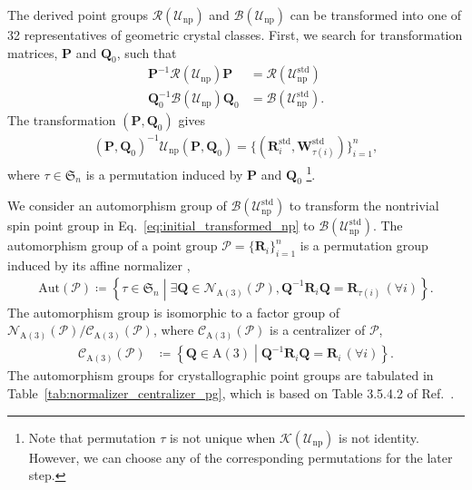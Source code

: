 \documentclass[a4paper, 11pt]{article}
\theoremstyle{definition}
\newcommand{\relmiddle}[1]{\mathrel{}\middle#1\mathrel{}}
\newcommand{\set}[2]{\left\{ #1 \relmiddle| #2 \right\}}
\begin{document}
The derived point groups $\mathcal{R}(\mathcal{U}_{\mathrm{np}})$ and $\mathcal{B}(\mathcal{U}_{\mathrm{np}})$ can be transformed into one of 32 representatives of geometric crystal classes.
First, we search for transformation matrices, $\bm{P}$ and $\bm{Q}_{0}$, such that
\begin{align}
  \bm{P}^{-1} \mathcal{R}(\mathcal{U}_{\mathrm{np}}) \bm{P} &= \mathcal{R}(\mathcal{U}_{\mathrm{np}}^{\mathrm{std}}) \\
  \bm{Q}_{0}^{-1} \mathcal{B}(\mathcal{U}_{\mathrm{np}}) \bm{Q}_{0} &= \mathcal{B}(\mathcal{U}_{\mathrm{np}}^{\mathrm{std}}).
\end{align}
The transformation $(\bm{P}, \bm{Q}_{0})$ gives
\begin{align}
  \label{eq:initial_transformed_np}
  (\bm{P}, \bm{Q}_{0})^{-1} \mathcal{U}_{\mathrm{np}} (\bm{P}, \bm{Q}_{0})
    = \{ (\bm{R}_{i}^{\mathrm{std}}, \bm{W}_{\tau(i)}^{\mathrm{std}}) \}_{i=1}^{n},
\end{align}
where $\tau \in \mathfrak{S}_{n}$ is a permutation induced by $\bm{P}$ and $\bm{Q}_{0}$ \footnote{
  Note that permutation $\tau$ is not unique when $\mathcal{K}(\mathcal{U}_{\mathrm{np}})$ is not identity.
  However, we can choose any of the corresponding permutations for the later step.
}.

We consider an automorphism group of $\mathcal{B}(\mathcal{U}_{\mathrm{np}}^{\mathrm{std}})$ to transform the nontrivial spin point group in Eq.~\eqref{eq:initial_transformed_np} to $\mathcal{B}(\mathcal{U}_{\mathrm{np}}^{\mathrm{std}})$.
The automorphism group of a point group $\mathcal{P} = \{ \bm{R}_{i} \}_{i=1}^{n}$ is a permutation group induced by its affine normalizer \cite{Gubler1982},
\begin{align}
  \mathrm{Aut}(\mathcal{P})
    \coloneqq \set {\tau \in \mathfrak{S}_{n} }{ \exists \bm{Q} \in \mathcal{N}_{\mathrm{A}(3)}(\mathcal{P}), \bm{Q}^{-1}\bm{R}_{i}\bm{Q} = \bm{R}_{\tau(i)} \, (\forall i) }.
\end{align}
The automorphism group is isomorphic to a factor group of $\mathcal{N}_{\mathrm{A}(3)}(\mathcal{P}) / \mathcal{C}_{\mathrm{A}(3)}(\mathcal{P})$, where $\mathcal{C}_{\mathrm{A}(3)}(\mathcal{P})$ is a centralizer of $\mathcal{P}$,
\begin{align}
  \mathcal{C}_{\mathrm{A}(3)}(\mathcal{P})
    &\coloneqq \set{ \bm{Q} \in \mathrm{A}(3) }{ \bm{Q}^{-1} \bm{R}_{i} \bm{Q} = \bm{R}_{i} \, (\forall i) }.
\end{align}
The automorphism groups for crystallographic point groups are tabulated in Table~\ref{tab:normalizer_centralizer_pg}, which is based on Table 3.5.4.2 of Ref.~\cite{koch2016normalizers}.
\end{document}
